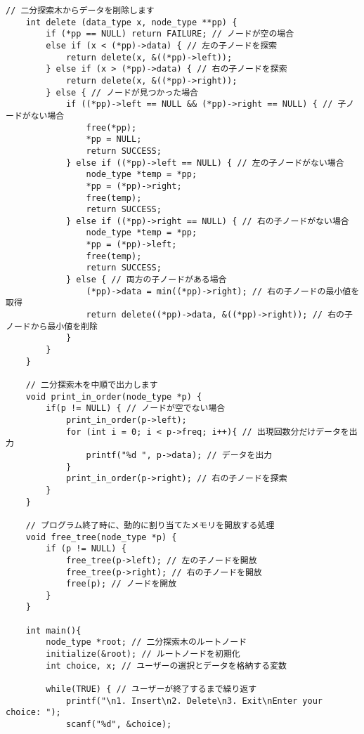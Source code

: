 \documentclass[]{jsarticle}
\begin{document}
\begin{lstlisting}[caption={binarySearchTree.c}]
    // 二分探索木からデータを削除します
    int delete (data_type x, node_type **pp) {
        if (*pp == NULL) return FAILURE; // ノードが空の場合
        else if (x < (*pp)->data) { // 左の子ノードを探索
            return delete(x, &((*pp)->left));
        } else if (x > (*pp)->data) { // 右の子ノードを探索
            return delete(x, &((*pp)->right));
        } else { // ノードが見つかった場合
            if ((*pp)->left == NULL && (*pp)->right == NULL) { // 子ノードがない場合
                free(*pp);
                *pp = NULL;
                return SUCCESS;
            } else if ((*pp)->left == NULL) { // 左の子ノードがない場合
                node_type *temp = *pp;
                *pp = (*pp)->right;
                free(temp);
                return SUCCESS;
            } else if ((*pp)->right == NULL) { // 右の子ノードがない場合
                node_type *temp = *pp;
                *pp = (*pp)->left;
                free(temp);
                return SUCCESS;
            } else { // 両方の子ノードがある場合
                (*pp)->data = min((*pp)->right); // 右の子ノードの最小値を取得
                return delete((*pp)->data, &((*pp)->right)); // 右の子ノードから最小値を削除
            }
        }
    }
    
    // 二分探索木を中順で出力します
    void print_in_order(node_type *p) {
        if(p != NULL) { // ノードが空でない場合
            print_in_order(p->left);
            for (int i = 0; i < p->freq; i++){ // 出現回数分だけデータを出力
                printf("%d ", p->data); // データを出力
            }
            print_in_order(p->right); // 右の子ノードを探索
        }
    }
    
    // プログラム終了時に、動的に割り当てたメモリを開放する処理
    void free_tree(node_type *p) {
        if (p != NULL) {
            free_tree(p->left); // 左の子ノードを開放
            free_tree(p->right); // 右の子ノードを開放
            free(p); // ノードを開放
        }
    }
    
    int main(){
        node_type *root; // 二分探索木のルートノード
        initialize(&root); // ルートノードを初期化
        int choice, x; // ユーザーの選択とデータを格納する変数
    
        while(TRUE) { // ユーザーが終了するまで繰り返す
            printf("\n1. Insert\n2. Delete\n3. Exit\nEnter your choice: "); 
            scanf("%d", &choice);
    

\end{lstlisting}
\end{document}
